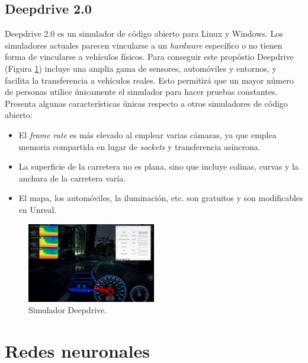 \subsection{Deepdrive 2.0}

Deepdrive 2.0 \cite{deepdrive} es un simulador de código abierto para Linux y Windows. Los simuladores actuales parecen vincularse a un \textit{hardware} específico o no tienen forma de vincularse a vehículos físicos. Para conseguir este propóstio Deepdrive (Figura \ref{fig.deepdrive}) incluye una amplia gama de sensores, automóviles y entornos, y facilita la transferencia a vehículos reales. Esto permitirá que un mayor número de personas utilice únicamente el simulador para hacer pruebas constantes.\\

Presenta algunas características únicas respecto a otros simuladores de código abierto:

\begin{itemize}
\item El \textit{frame rate} es más elevado al emplear varias cámaras, ya que emplea memoria compartida en lugar de \textit{sockets} y transferencia asíncrona.
\item La superficie de la carretera no es plana, sino que incluye colinas, curvas y la anchura de la carretera varía.
\item El mapa, los automóviles, la iluminación, etc. son gratuitos y son modificables en Unreal.
\end{itemize}

\begin{figure}
\begin{center}
	\includegraphics[width=0.5\textwidth]{figures/Estado_arte/deepdrive.png}
   \caption{Simulador Deepdrive.}
	\label{fig.deepdrive}
\end{center}
\end{figure}


\section{Redes neuronales}

